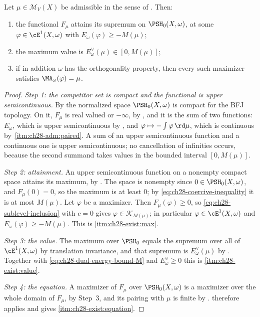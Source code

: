 \begin{theorem}
\label{thm:ch28-existence-admissible}
Let $\mu\in\mathcal M_V(X)$ be admissible in the sense of
.  Then:
\begin{enumerate}
\item\label{itm:ch28-exist:max}
 the functional $F_\mu$ attains its supremum on $\PSH_0(X,\omega)$, at
 some $\varphi\in\cE^1(X,\omega)$ with
 $E_\omega(\varphi)\geq-M(\mu)$;
\item\label{itm:ch28-exist:value}
 the maximum value is $E^\vee_\omega(\mu)\in[0,M(\mu)]$;
\item\label{itm:ch28-exist:equation}
 if in addition $\omega$ has the orthogonality property, then every such
 maximizer satisfies $\MA_\omega(\varphi)=\mu$.
\end{enumerate}
\end{theorem}

\begin{proof}
\emph{Step 1: the competitor set is compact and the functional is upper
semicontinuous.}  By  the normalized space
$\PSH_0(X,\omega)$ is compact for the BFJ topology.  On it, $F_\mu$ is
real valued or $-\infty$, by , and it is the sum
of two functions: $E_\omega$, which is upper semicontinuous by
, and
$\varphi\mapsto-\int\varphi\,\rd\mu$, which is continuous by
\,\cref{itm:ch28-adm:paired}.  A sum of an
upper semicontinuous function and a continuous one is upper semicontinuous;
no cancellation of infinities occurs, because the second summand takes
values in the bounded interval $[0,M(\mu)]$.

\emph{Step 2: attainment.}  An upper semicontinuous function on a nonempty
compact space attains its maximum, by .  The space
is nonempty since $0\in\PSH_0(X,\omega)$, and $F_\mu(0)=0$, so the
maximum is at least $0$; by \eqref{eq:ch28-coercive-inequality} it is at
most $M(\mu)$.  Let $\varphi$ be a maximizer.  Then
$F_\mu(\varphi)\geq0$, so \eqref{eq:ch28-sublevel-inclusion} with $c=0$
gives $\varphi\in\mathcal K_{M(\mu)}$; in particular
$\varphi\in\cE^1(X,\omega)$ and $E_\omega(\varphi)\geq-M(\mu)$.  This is
\cref{itm:ch28-exist:max}.

\emph{Step 3: the value.}  The maximum over $\PSH_0$ equals the supremum
over all of $\cE^1(X,\omega)$ by translation invariance, and that supremum
is $E^\vee_\omega(\mu)$ by .  Together
with \eqref{eq:ch28-dual-energy-bound-M} and $E^\vee_\omega\geq0$ this is
\cref{itm:ch28-exist:value}.

\emph{Step 4: the equation.}  A maximizer of $F_\mu$ over
$\PSH_0(X,\omega)$ is a maximizer over the whole domain of $F_\mu$, by
Step~3, and its pairing with $\mu$ is finite by
.  
therefore applies and gives \cref{itm:ch28-exist:equation}.
\end{proof}

